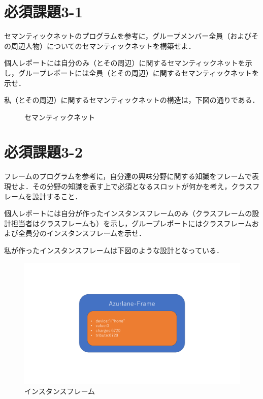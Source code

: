\documentclass[12pt]{jarticle}
\begin{document}
\section{必須課題3-1}
\begin{screen}
セマンティックネットのプログラムを参考に，グループメンバー全員（およびその周辺人物）についてのセマンティックネットを構築せよ．

個人レポートには自分のみ（とその周辺）に関するセマンティックネットを示し，グループレポートには全員（とその周辺）に関するセマンティックネットを示せ．
\end{screen}
私（とその周辺）に関するセマンティックネットの構造は，下図の通りである．
\begin{figure}[!hbt]
  	\begin{center}
	\end{center}
  	\caption{セマンティックネット}
\end{figure}


\section{必須課題3-2}
\begin{screen}
フレームのプログラムを参考に，自分達の興味分野に関する知識をフレームで表現せよ．その分野の知識を表す上で必須となるスロットが何かを考え，クラスフレームを設計すること．

個人レポートには自分が作ったインスタンスフレームのみ（クラスフレームの設計担当者はクラスフレームも）を示し，グループレポートにはクラスフレームおよび全員分のインスタンスフレームを示せ．
\end{screen}
私が作ったインスタンスフレームは下図のような設計となっている．
\begin{figure}[!hbt]
  	\begin{center}
  		\includegraphics[scale=0.40]{images/azurlane.pdf}
	\end{center}
  	\caption{インスタンスフレーム}
\end{figure}
\end{document}

